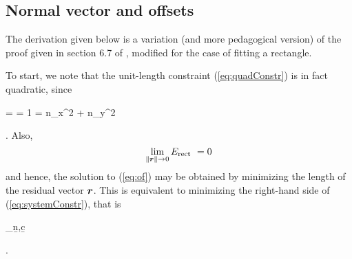 
\subsection{Normal vector and offsets}

The derivation given below is a variation (and more pedagogical version) of the proof given in section 6.7 of \cite{SciCom},  modified for the case of fitting a rectangle.



To start, we note that the unit-length constraint (\ref{eq:quadConstr}) is in fact quadratic, since 
\begin{eqRef}\label{eq:quad}
	 =  = 1 =  n_x^2 + n_y^2
\end{eqRef}
. Also,  
$$ \lim_{{\lVert \boldsymbol{r} \rVert} \to 0 } E_{\text{rect}}  \\\\\\\\\\\\\\\ = 0  $$
and hence, the solution to (\ref{eq:of}) may be obtained by minimizing the length of the residual vector $\boldsymbol{r}$. This is equivalent to minimizing the right-hand side of (\ref{eq:systemConstr}), that is
\begin{eqRef}\label{eq:restatement}
	\arg	\min_{\b{n},\b{c}}   
\end{eqRef}
. 

